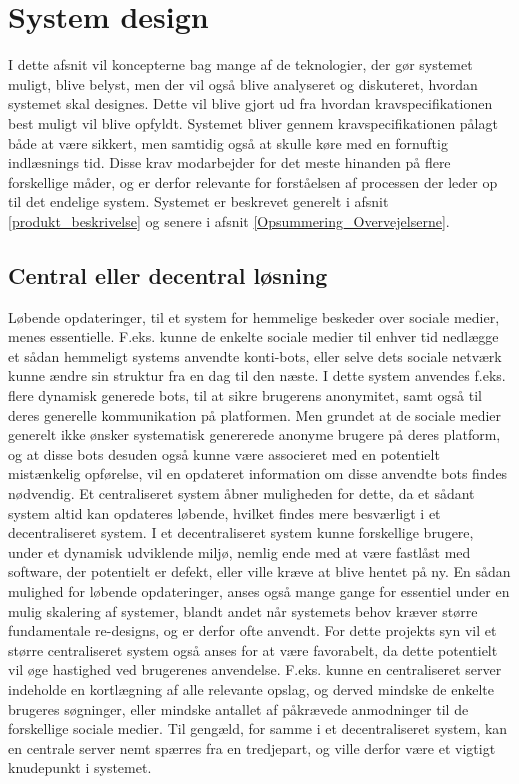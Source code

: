 \section{System design}
I dette afsnit vil koncepterne bag mange af de teknologier, der gør systemet muligt, blive belyst, men der vil også blive analyseret og diskuteret, hvordan systemet skal designes. Dette vil blive gjort ud fra hvordan kravspecifikationen best muligt vil blive opfyldt.
Systemet bliver gennem kravspecifikationen pålagt både at være sikkert, men samtidig også at skulle køre med en fornuftig indlæsnings tid. Disse krav modarbejder for det meste hinanden på flere forskellige måder, og er derfor relevante for forståelsen af processen der leder op til det endelige system. Systemet er beskrevet generelt i afsnit \ref{produkt_beskrivelse} og senere i afsnit \ref{Opsummering_Overvejelserne}. 

\subsection{Central eller decentral løsning}
Løbende opdateringer, til et system for hemmelige beskeder over sociale medier, menes essentielle. F.eks. kunne de enkelte sociale medier til enhver tid nedlægge et sådan hemmeligt systems anvendte konti-bots, eller selve dets sociale netværk kunne ændre sin struktur fra en dag til den næste.
I dette system anvendes f.eks. flere dynamisk generede bots, til at sikre brugerens anonymitet, samt også til deres generelle kommunikation på platformen. Men grundet at de sociale medier generelt ikke ønsker systematisk genererede anonyme brugere på deres platform, og at disse bots desuden også kunne være associeret med en potentielt mistænkelig opførelse, vil en opdateret information om disse anvendte bots findes nødvendig.
Et centraliseret system åbner muligheden for dette, da et sådant system altid kan opdateres løbende, hvilket findes mere besværligt i et decentraliseret system. I et decentraliseret system kunne forskellige brugere, under et dynamisk udviklende miljø, nemlig ende med at være fastlåst med software, der potentielt er defekt, eller ville kræve at blive hentet på ny.
En sådan mulighed for løbende opdateringer, anses også mange gange for essentiel under en mulig skalering af systemer, blandt andet når systemets behov kræver større fundamentale re-designs, og er derfor ofte anvendt.
For dette projekts syn vil et større centraliseret system også anses for at være favorabelt, da dette potentielt vil øge hastighed ved brugerenes anvendelse. F.eks. kunne en centraliseret server indeholde en kortlægning af alle relevante opslag, og derved mindske de enkelte brugeres søgninger, eller mindske antallet af påkrævede anmodninger til de forskellige sociale medier.
Til gengæld, for samme i et decentraliseret system, kan en centrale server nemt spærres fra en tredjepart, og ville derfor være et vigtigt knudepunkt i systemet.

